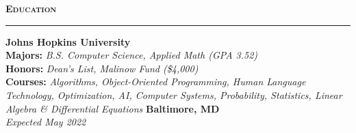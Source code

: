 \documentclass[10pt, letterpaper]{article}
\begin{document}
{\large \textbf{\textsc{Education}}}
\vspace{5pt}
\hrule
{}
\begin{paracol}{2}
	\textbf{Johns Hopkins University}\\
	\textbf{Majors:} \textit{B.S. Computer Science, Applied Math (GPA 3.52)}\\
	\textbf{Honors:} \textit{Dean's List, Malinow Fund (\$4,000)}\\
	\textbf{Courses:} \textit{Algorithms, Object-Oriented Programming, Human Language Technology, Optimization, AI, Computer Systems, Probability, Statistics, Linear Algebra \& Differential Equations}
	\switchcolumn
	\raggedleft\textbf{Baltimore, MD}\\
	\raggedleft\textit{Expected May 2022}
\end{paracol}
\end{document}
